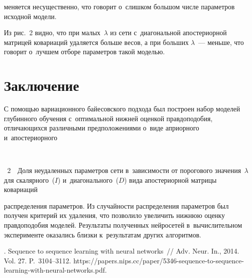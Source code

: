 \begin{multicols}{2}




\noindent
 меняется несущественно, что говорит о~слишком большом числе 
параметров исходной модели.



Из рис.~2 видно, что при малых~$\lambda$ из сети с~диагональной 
апостериорной матрицей ковариаций удаляется больше весов, а при больших 
$\lambda$~--- меньше, что говорит о~лучшем отборе параметров такой моделью.


\section{Заключение}

\vspace*{-26pt}

С помощью вариационного байесовского подхода был построен набор моделей 
глубинного обуче\-ния с~оптимальной нижней оценкой правдоподобия, отличающихся 
различными предположениями о~виде априорного и~апостериорного\linebreak\vspace*{-12pt}

{ \begin{center}  %
 \vspace*{1pt}
  \mbox{%
 \epsfxsize=78.898mm 
 }


\end{center}


\noindent
{{\figurename~2}\ \ \small{Доля неудаленных параметров сети в~зависимости от порогового 
значения~$\lambda$ для скалярного~($I$) и~диагонального~($D$) вида апостериорной 
матрицы ковариаций}}
}

\vspace*{9pt}

\noindent
 распреде\-ле\-ния 
параметров. Из случайности распределения параметров был получен критерий их 
удаления, что позволило увеличить нижнюю оценку правдоподобия моделей. 
Результаты полученных нейросетей в~вычислительном эксперименте оказались близки к~результатам других алгоритмов.



{\small\frenchspacing
 {%
 \begin{thebibliography}{99}
    . Sequence to sequence 
learning with neural networks~// Adv. Neur. In., 2014. Vol. 27. P.~3104--3112. {\sf
https://papers.nips.cc/\linebreak paper/5346-sequence-to-sequence-learning-with-neural-networks.pdf}.
    

\end{thebibliography}}}
\end{multicols}
